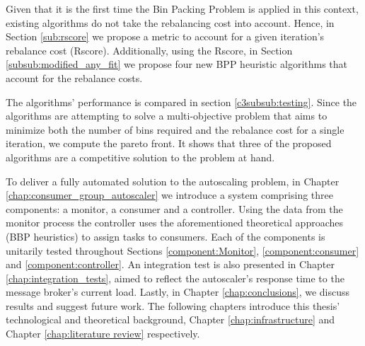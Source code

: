 Given that it is the first time the Bin Packing Problem is applied in this
context, existing algorithms do not take the rebalancing cost into account.
Hence, in Section \ref{sub:rscore} we propose a metric to account for a given
iteration's rebalance cost (Rscore). Additionally, using the Rscore, in Section
\ref{subsub:modified_any_fit} we propose four new BPP heuristic algorithms that
account for the rebalance costs.

The algorithms' performance is compared in section \ref{c3subsub:testing}. Since
the algorithms are attempting to solve a multi-objective problem that aims to
minimize both the number of bins required and the rebalance cost for a single
iteration, we compute the pareto front. It shows that three of the proposed
algorithms are a competitive solution to the problem at hand.

To deliver a fully automated solution to the autoscaling problem, in Chapter
\ref{chap:consumer_group_autoscaler} we introduce a system comprising three
components: a monitor, a consumer and a controller. Using the data from the
monitor process the controller uses the aforementioned theoretical approaches
(BBP heuristics) to assign tasks to consumers. Each of the components is
unitarily tested throughout Sections \ref{component:Monitor},
\ref{component:consumer} and \ref{component:controller}. An integration test is
also presented in Chapter \ref{chap:integration_tests}, aimed to reflect the
autoscaler's response time to the message broker's current load. Lastly, in
Chapter \ref{chap:conclusions}, we discuss results and suggest future work.
The following chapters introduce this thesis' technological and theoretical
background, Chapter \ref{chap:infrastructure} and Chapter \ref{chap:literature
review} respectively.


